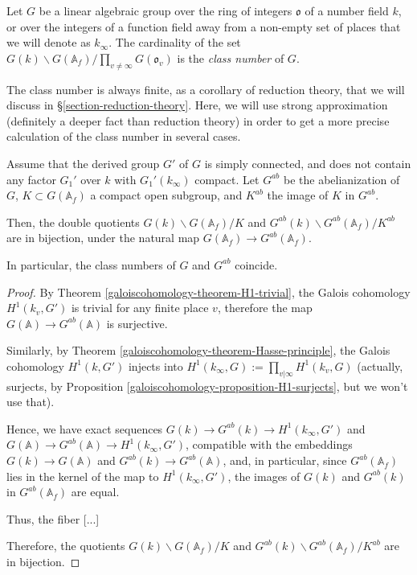 \begin{definition}
 \label{definition-class-number}
 Let $G$ be a linear algebraic group over the ring of integers $\mathfrak o$ of a number field $k$, or over the integers of a function field away from a non-empty set of places that we will denote as $k_\infty$. The cardinality of the set $G(k)\backslash G(\mathbb A_f)/\prod_{v\ne \infty} G(\mathfrak o_v)$ is the {\it class number} of $G$. 
\end{definition}

The class number is always finite, as a corollary of reduction theory, that we will discuss in \S \ref{section-reduction-theory}. Here, we will use strong approximation (definitely a deeper fact than reduction theory) in order to get a more precise calculation of the class number in several cases.

\begin{proposition}
\label{proposition-class-number-abelianization}
Assume that the derived group $G'$ of $G$ is simply connected, and does not contain any factor $G_1'$ over $k$ with $G_1'(k_\infty)$ compact. Let $G^{ab}$ be the abelianization of $G$, $K\subset G(\mathbb A_f)$ a compact open subgroup, and $K^{ab}$ the image of $K$ in $G^{ab}$. 

Then, the double quotients $G(k)\backslash G(\mathbb A_f)/K$ and $G^{ab}(k)\backslash G^{ab}(\mathbb A_f)/K^{ab}$ are in bijection, under the natural map $G(\mathbb A_f)\to G^{ab}(\mathbb A_f)$.

In particular, the class numbers of $G$ and $G^{ab}$ coincide.
\end{proposition}

\begin{proof}
 By Theorem \ref{galoiscohomology-theorem-H1-trivial}, the Galois cohomology $H^1(k_v, G')$ is trivial for any finite place $v$, therefore the map $G(\mathbb A)\to G^{ab}(\mathbb A)$ is surjective. 
 
 Similarly, by Theorem \ref{galoiscohomology-theorem-Hasse-principle}, the Galois cohomology $H^1(k, G')$ injects into $H^1(k_\infty, G) := \prod_{v|\infty} H^1(k_v, G)$ (actually, surjects, by Proposition \ref{galoiscohomology-proposition-H1-surjects}, but we won't use that).
 
 Hence, we have exact sequences $G(k)\to G^{ab}(k) \to H^1(k_\infty, G')$ and $G(\mathbb A)\to G^{ab}(\mathbb A) \to H^1(k_\infty,G')$, compatible with the embeddings $G(k)\to G(\mathbb A)$ and $G^{ab}(k)\to G^{ab}(\mathbb A)$, and, in particular, since $G^{ab}(\mathbb A_f)$ lies in the kernel of the map to $H^1(k_\infty, G')$, the images of $G(k)$ and $G^{ab}(k)$ in $G^{ab}(\mathbb A_f)$ are equal. 
 
 Thus, the fiber [...]
 
 Therefore, the quotients $G(k)\backslash G(\mathbb A_f)/K$ and $G^{ab}(k)\backslash G^{ab}(\mathbb A_f)/K^{ab}$ are in bijection.
\end{proof}

